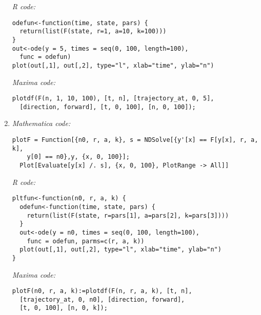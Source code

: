 \documentclass[12pt]{article}
\begin{document}
\begin{enumerate}[label=\alph*]
\textit{R code:}
\lstset{language=R, basicstyle=\footnotesize} 
\begin{lstlisting}[frame=single]
odefun<-function(time, state, pars) {
  return(list(F(state, r=1, a=10, k=100)))
}
out<-ode(y = 5, times = seq(0, 100, length=100),
  func = odefun)
plot(out[,1], out[,2], type="l", xlab="time", ylab="n")
\end{lstlisting}

\textit{Maxima code:}
\lstset{language=Maxima, basicstyle=\footnotesize} 
\begin{lstlisting}[frame=single]
plotdf(F(n, 1, 10, 100), [t, n], [trajectory_at, 0, 5],
  [direction, forward], [t, 0, 100], [n, 0, 100]);
\end{lstlisting}

\item{}
\textit{Mathematica code:}
\lstset{language=Mathematica, basicstyle=\footnotesize} 
\begin{lstlisting}[frame=single]
plotF = Function[{n0, r, a, k}, s = NDSolve[{y'[x] == F[y[x], r, a, k],
    y[0] == n0},y, {x, 0, 100}];
  Plot[Evaluate[y[x] /. s], {x, 0, 100}, PlotRange -> All]]
\end{lstlisting}

\textit{R code:}
\lstset{language=R, basicstyle=\footnotesize} 
\begin{lstlisting}[frame=single]
pltfun<-function(n0, r, a, k) {
  odefun<-function(time, state, pars) {
    return(list(F(state, r=pars[1], a=pars[2], k=pars[3])))
  }
  out<-ode(y = n0, times = seq(0, 100, length=100),
    func = odefun, parms=c(r, a, k))
  plot(out[,1], out[,2], type="l", xlab="time", ylab="n")
}
\end{lstlisting}

\textit{Maxima code:}
\lstset{language=Maxima, basicstyle=\footnotesize} 
\begin{lstlisting}[frame=single]
plotF(n0, r, a, k):=plotdf(F(n, r, a, k), [t, n],
  [trajectory_at, 0, n0], [direction, forward],
  [t, 0, 100], [n, 0, k]);
\end{lstlisting}
\end{enumerate}
\fi
\end{document}
